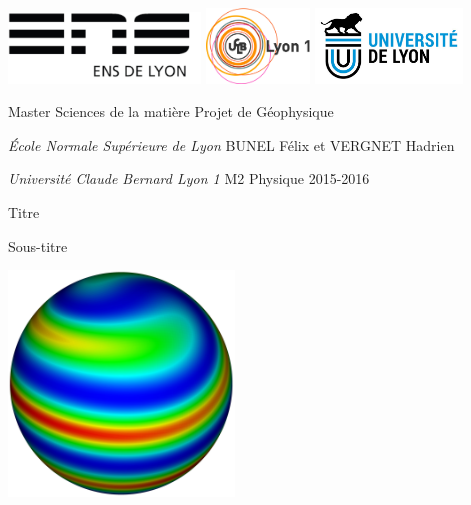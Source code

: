 \documentclass[10pt,a4paper]{article}
\author{Bunel Félix et Vergnet Hadrien}
\numberwithin{equation}{section}
\begin{document}
\begin{titlepage}
\thispagestyle{empty}
\setlength{\parindent}{0pt}

\includegraphics[height=1.9cm]{logo-ens.jpg} \hfill \includegraphics[height=2cm]{logo_lyon1.jpg} \hfill \includegraphics[height=2cm]{logo_univ_lyon.jpg}



Master Sciences de la matière
\hfill
Projet de Géophysique

\textit{École Normale Supérieure de Lyon}
\hfill
BUNEL Félix et VERGNET Hadrien

\textit{Université Claude Bernard Lyon 1}
\hfill
M2 Physique 2015-2016
\vspace{0.5cm}

\hrulefill
\vspace{-0.6cm}

\hrulefill
\begin{center}\bfseries
\begin{huge}
    Titre
\end{huge}
\Large
\vspace{0.4cm}

Sous-titre
\end{center}
\hrulefill
\vspace{-0.6cm}

\hrulefill


\begin{center}
\includegraphics[height=6cm]{figures/front_simu.jpg} 
\end{center} 



\end{titlepage}
\end{document}
